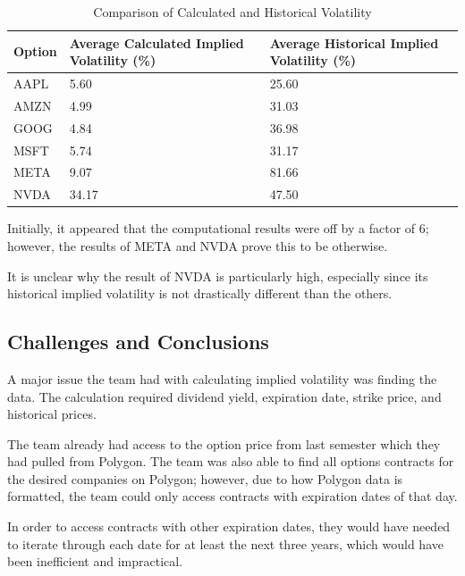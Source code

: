 \documentclass[11pt]{article}
\begin{document}
\begin{table}[H]
    \centering
    \begin{adjustbox}{width=0.5\textwidth}
    \begin{tabularx}{\linewidth}{|X|X|X|}
        \hline
        \textbf{Option} & \textbf{Average Calculated Implied Volatility (\%)} & \textbf{Average Historical Implied Volatility (\%)} \\
        \hline
        AAPL & 5.60 & 25.60 \\
        \hline
        AMZN & 4.99 & 31.03 \\
        \hline
        GOOG & 4.84 & 36.98 \\
        \hline
        MSFT & 5.74 & 31.17 \\
        \hline        
        META & 9.07 & 81.66 \\
        \hline       
        NVDA & 34.17 & 47.50 \\
        
        \hline
    \end{tabularx}
    \end{adjustbox}
    \caption{Comparison of Calculated and Historical Volatility}
    \label{tab:volatility_comparison}
\end{table}
Initially, it appeared that the computational results were off by a factor of 6; however, the results of META and NVDA prove this to be otherwise. 

It is unclear why the result of NVDA is particularly high, especially since its historical implied volatility is not drastically different than the others. 

\subsection{Challenges and Conclusions}
A major issue the team had with calculating implied volatility was finding the data. The calculation required dividend yield, expiration date, strike price, and historical prices. 

The team already had access to the option price from last semester which they had pulled from Polygon. The team was also able to find all options contracts for the desired companies on Polygon; however, due to how Polygon data is formatted, the team could only access contracts with expiration dates of that day. 

In order to access contracts with other expiration dates, they would have needed to iterate through each date for at least the next three years, which would have been inefficient and impractical. 
\end{document}
